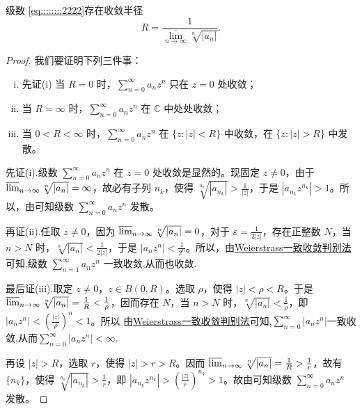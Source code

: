 \documentclass[../../main.tex]{subfiles}
\begin{document}
\begin{theorem}\label{theorem:定理4.2.2}
级数 \eqref{eq::::::::2222}存在收敛半径
\[
R=\frac{1}{\underset{n\rightarrow \infty}{\overline{\lim }}\sqrt[n]{|a_n|}}.
\]
\end{theorem}
\begin{proof}
我们要证明下列三件事：
\begin{enumerate}[(i)]
\item 先证(i) 当 \( R = 0 \) 时，\( \sum_{n=0}^{\infty} a_n z^n \) 只在 \( z = 0 \) 处收敛；

\item 当 \( R = \infty \) 时，\( \sum_{n=0}^{\infty} a_n z^n \) 在 \( \mathbb{C} \) 中处处收敛；

\item 当 \( 0 < R < \infty \) 时，\( \sum_{n=0}^{\infty} a_n z^n \) 在 \( \{z : |z| < R\} \) 中收敛，在 \( \{z : |z| > R\} \) 中发散。
\end{enumerate}
先证(i).级数 \( \sum_{n=0}^{\infty} a_n z^n \) 在 \( z = 0 \) 处收敛是显然的。现固定 \( z \neq 0 \)，由于 \( \varlimsup_{n \to \infty} \sqrt[n]{|a_n|} = \infty \)，故必有子列 \( n_k \)，使得 \( \sqrt[n_k]{|a_{n_k}|} > \frac{1}{|z|} \)，于是 \( |a_{n_k} z^{n_k}| > 1 \)。所以，由可知级数 \( \sum_{n=0}^{\infty} a_n z^n \) 发散。

再证(ii).任取 \( z \neq 0 \)，因为 \( \varlimsup_{n \to \infty} \sqrt[n]{|a_n|} = 0 \)，对于 \( \varepsilon = \frac{1}{2|z|} \)，存在正整数 \( N \)，当 \( n > N \) 时，\( \sqrt[n]{|a_n|} < \frac{1}{2|z|} \)，于是 \( |a_n z^n| < \frac{1}{2^n} \)。所以，由\hyperref[theorem:Weierstrass一致收敛判别法]{Weierstrass一致收敛判别法}可知,级数 \( \sum_{n=1}^{\infty} a_n z^n \) 一致收敛,从而也收敛.

最后证(iii).取定 \( z \neq 0 \)，\( z \in B(0, R) \)。选取 \( \rho \)，使得 \( |z| < \rho < R \)。于是 \( \varlimsup_{n \to \infty} \sqrt[n]{|a_n|} = \frac{1}{R} < \frac{1}{\rho} \)，因而存在 \( N \)，当 \( n > N \) 时，\( \sqrt[n]{|a_n|} < \frac{1}{\rho} \)，即 \( |a_n z^n| < \left( \frac{|z|}{\rho} \right)^n<1 \)。所以 由\hyperref[theorem:Weierstrass一致收敛判别法]{Weierstrass一致收敛判别法}可知,\( \sum_{n=0}^{\infty} |a_n z^n|\)一致收敛,从而\( \sum_{n=0}^{\infty} |a_n z^n| < \infty \).

再设 \( |z| > R \)，选取 \( r \)，使得 \( |z| > r > R \)。因而 \( \varlimsup_{n \to \infty} \sqrt[n]{|a_n|} = \frac{1}{R} > \frac{1}{r} \)，故有 \( \{n_k\} \)，使得 \( \sqrt[n_k]{|a_{n_k}|} > \frac{1}{r} \)，即 \( |a_{n_k} z^{n_k}| > \left( \frac{|z|}{r} \right)^{n_k} > 1 \)。故由可知级数 \( \sum_{n=0}^{\infty} a_n z^n \) 发散。
\end{proof}
\end{document}
